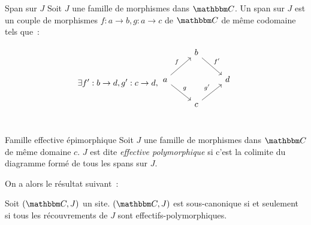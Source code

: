 \begin{defi}{Span sur $J$}
    Soit $J$ une famille de morphismes dans $\C$. Un span sur $J$ est un couple de
    morphismes $f:a\rightarrow b,g:a\rightarrow c$ de $\C$ de même codomaine tels que~:

    \[\exists f':b\rightarrow d, g':c\rightarrow d,\begin{tikzcd}
        & b \arrow[rd, "f'"] & \\
        a \arrow[ru, "f"] \arrow[rd, "g"] & & d \\
        & c \arrow[ru, "g'"] & \\
    \end{tikzcd}\]
\end{defi}

\begin{defi}{Famille effective épimorphique}
    Soit $J$ une famille de morphismes dans $\C$ de même domaine $c$. $J$ est dite
    \emph{effective polymorphique} si c'est la colimite du diagramme formé de tous
    les spans sur $J$.
\end{defi}

On a alors le résultat suivant~:

\begin{lem}
    Soit $(\C,J)$ un site. $(\C,J)$ est sous-canonique si et seulement si tous les
    récouvrements de $J$ sont effectifs-polymorphiques.
\end{lem}

